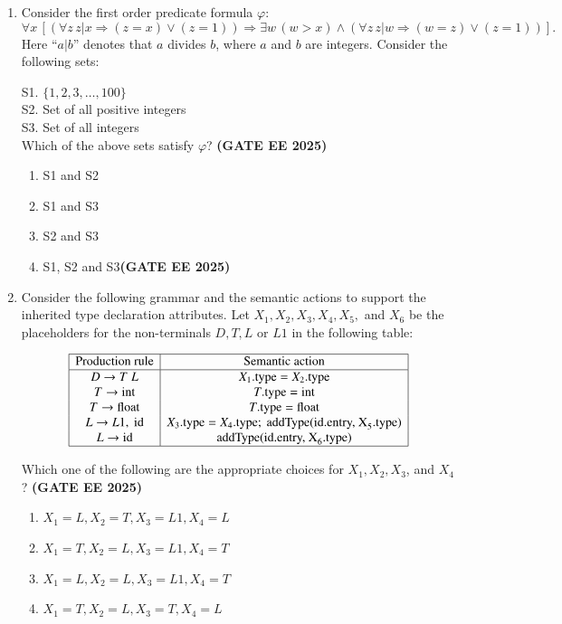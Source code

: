 \documentclass[journal,12pt,onecolumn]{IEEEtran}
\theoremstyle{remark}
\begin{document}
\begin{enumerate}
\item  Consider the first order predicate formula $\varphi$:  
\[
\forall x \, [(\forall z \, z|x \Rightarrow (z = x) \lor (z = 1)) \Rightarrow \exists w \, (w > x) \land (\forall z \, z|w \Rightarrow (w = z) \lor (z = 1))].
\]  
Here ``$a|b$'' denotes that $a$ divides $b$, where $a$ and $b$ are integers. Consider the following sets:  

S1. $\{1,2,3,\ldots,100\}$ \\
S2. Set of all positive integers \\
S3. Set of all integers\\

Which of the above sets satisfy $\varphi$?  \hfill \textbf{(GATE EE 2025)}

\begin{enumerate}
  \item   S1 and S2
  \item   S1 and S3
  \item   S2 and S3
  \item   S1, S2 and S3\hfill \textbf{(GATE EE 2025)}
\end{enumerate}
\item Consider the following grammar and the semantic actions to support the inherited type declaration attributes. Let $X_1, X_2, X_3, X_4, X_5,$ and $X_6$ be the placeholders for the non-terminals $D, T, L$ or $L1$ in the following table:


\[
\begin{array}{|c|c|}
\hline
\text{Production rule} & \text{Semantic action} \\
\hline
D \to T \ L & X_1.\text{type} = X_2.\text{type} \\
T \to \text{int} & T.\text{type} = \text{int} \\
T \to \text{float} & T.\text{type} = \text{float} \\
L \to L1 , \ \text{id} & X_3.\text{type} = X_4.\text{type};\ \text{addType(id.entry, X}_5.\text{type)} \\
L \to \text{id} & \text{addType(id.entry, X}_6.\text{type)} \\
\hline
\end{array}
\]


Which one of the following are the appropriate choices for $X_1, X_2, X_3$, and $X_4$?
\hfill \textbf{(GATE EE 2025)}
\begin{enumerate}
\item  $X_1 = L, X_2 = T, X_3 = L1, X_4 = L$
\item  $X_1 = T, X_2 = L, X_3 = L1, X_4 = T$
\item  $X_1 = L, X_2 = L, X_3 = L1, X_4 = T$
\item  $X_1 = T, X_2 = L, X_3 = T, X_4 = L$
\end{enumerate}


\end{enumerate}
\end{document}
